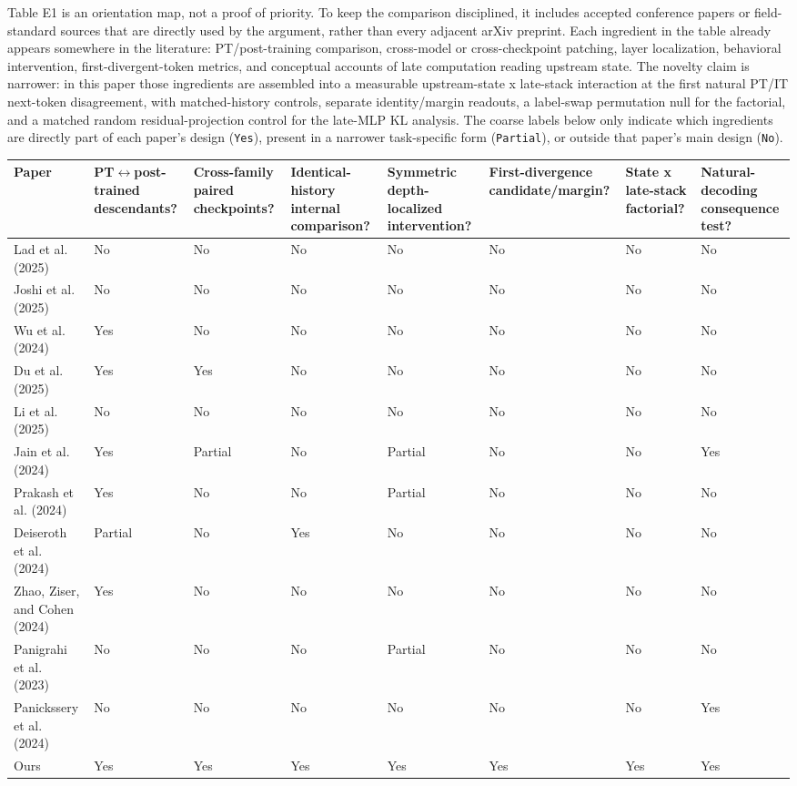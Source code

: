 \documentclass[11pt]{article}
\begin{document}
Table E1 is an orientation map, not a proof of priority. To keep the comparison disciplined, it includes accepted conference papers or field-standard sources that are directly used by the argument, rather than every adjacent arXiv preprint. Each ingredient in the table already appears somewhere in the literature: PT/post-training comparison, cross-model or cross-checkpoint patching, layer localization, behavioral intervention, first-divergent-token metrics, and conceptual accounts of late computation reading upstream state. The novelty claim is narrower: in this paper those ingredients are assembled into a measurable upstream-state x late-stack interaction at the first natural PT/IT next-token disagreement, with matched-history controls, separate identity/margin readouts, a label-swap permutation null for the factorial, and a matched random residual-projection control for the late-MLP KL analysis. The coarse labels below only indicate which ingredients are directly part of each paper's design (\texttt{Yes}), present in a narrower task-specific form (\texttt{Partial}), or outside that paper's main design (\texttt{No}).

\begin{table}[t]
\centering
\small
\setlength{\tabcolsep}{3pt}
\begin{tabularx}{\linewidth}{@{}>{\raggedright\arraybackslash}X >{\raggedright\arraybackslash}X >{\raggedright\arraybackslash}X >{\raggedright\arraybackslash}X >{\raggedright\arraybackslash}X >{\raggedright\arraybackslash}X >{\raggedright\arraybackslash}X >{\raggedright\arraybackslash}X@{}}
\toprule
Paper & PT\ensuremath{\leftrightarrow}post-trained descendants? & Cross-family paired checkpoints? & Identical-history internal comparison? & Symmetric depth-localized intervention? & First-divergence candidate/margin? & State x late-stack factorial? & Natural-decoding consequence test? \\
\midrule
Lad et al. (2025) & No & No & No & No & No & No & No \\
Joshi et al. (2025) & No & No & No & No & No & No & No \\
Wu et al. (2024) & Yes & No & No & No & No & No & No \\
Du et al. (2025) & Yes & Yes & No & No & No & No & No \\
Li et al. (2025) & No & No & No & No & No & No & No \\
Jain et al. (2024) & Yes & Partial & No & Partial & No & No & Yes \\
Prakash et al. (2024) & Yes & No & No & Partial & No & No & No \\
Deiseroth et al. (2024) & Partial & No & Yes & No & No & No & No \\
Zhao, Ziser, and Cohen (2024) & Yes & No & No & No & No & No & No \\
Panigrahi et al. (2023) & No & No & No & Partial & No & No & No \\
Panickssery et al. (2024) & No & No & No & No & No & No & Yes \\
Ours & Yes & Yes & Yes & Yes & Yes & Yes & Yes \\
\bottomrule
\end{tabularx}
\end{table}
\end{document}
